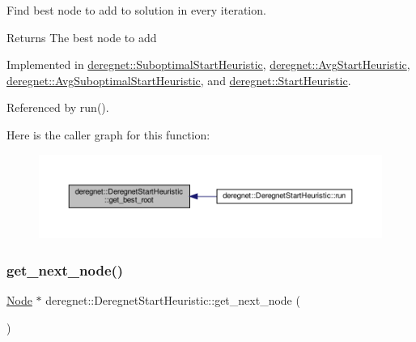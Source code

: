 Find best node to add to solution in every iteration. 

\begin{DoxyReturn}{Returns}
The best node to add 
\end{DoxyReturn}


Implemented in \hyperlink{classderegnet_1_1SuboptimalStartHeuristic_aaa8bad0a658a0e1de5e849a5fb58aa21}{deregnet\+::\+Suboptimal\+Start\+Heuristic}, \hyperlink{classderegnet_1_1AvgStartHeuristic_ac13190b98b5611ad231fe3d9447431fb}{deregnet\+::\+Avg\+Start\+Heuristic}, \hyperlink{classderegnet_1_1AvgSuboptimalStartHeuristic_a732194c0c56e6f28839114e3ab119109}{deregnet\+::\+Avg\+Suboptimal\+Start\+Heuristic}, and \hyperlink{classderegnet_1_1StartHeuristic_a84ed02caf211e22b663e4e3c0d5b4f24}{deregnet\+::\+Start\+Heuristic}.



Referenced by run().

Here is the caller graph for this function\+:\nopagebreak
\begin{figure}[H]
\begin{center}
\leavevmode
\includegraphics[width=350pt]{classderegnet_1_1DeregnetStartHeuristic_a372be86d0fb8ac94bd926a1f4d09e102_icgraph}
\end{center}
\end{figure}
\mbox{\label{classderegnet_1_1DeregnetStartHeuristic_a6ec478444151e54625951f858ff76761}} 
\subsubsection{\texorpdfstring{get\+\_\+next\+\_\+node()}{get\_next\_node()}}
{\footnotesize\ttfamily \hyperlink{namespacederegnet_a744bad34f2de9856d36715a445f027f3}{Node} $\ast$ deregnet\+::\+Deregnet\+Start\+Heuristic\+::get\+\_\+next\+\_\+node (\begin{DoxyParamCaption}{ }\end{DoxyParamCaption})\hspace{0.3cm}{\ttfamily [protected]}}



